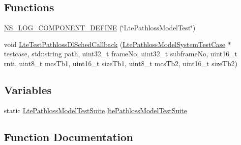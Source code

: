 \subsection*{Functions}
\begin{DoxyCompactItemize}
\item 
\hyperlink{lte-test-pathloss-model_8cc_a7faf96b7d347a42a910362c7371368f1}{N\+S\+\_\+\+L\+O\+G\+\_\+\+C\+O\+M\+P\+O\+N\+E\+N\+T\+\_\+\+D\+E\+F\+I\+NE} (\char`\"{}Lte\+Pathloss\+Model\+Test\char`\"{})
\item 
void \hyperlink{lte-test-pathloss-model_8cc_a84edf7cdf8785575c6b0553a9fa20543}{Lte\+Test\+Pathloss\+Dl\+Sched\+Callback} (\hyperlink{classLtePathlossModelSystemTestCase}{Lte\+Pathloss\+Model\+System\+Test\+Case} $\ast$testcase, std\+::string path, uint32\+\_\+t frame\+No, uint32\+\_\+t subframe\+No, uint16\+\_\+t rnti, uint8\+\_\+t mcs\+Tb1, uint16\+\_\+t size\+Tb1, uint8\+\_\+t mcs\+Tb2, uint16\+\_\+t size\+Tb2)
\end{DoxyCompactItemize}
\subsection*{Variables}
\begin{DoxyCompactItemize}
\item 
static \hyperlink{classLtePathlossModelTestSuite}{Lte\+Pathloss\+Model\+Test\+Suite} \hyperlink{lte-test-pathloss-model_8cc_a8fd304b5141294c8b791245c353c0cfa}{lte\+Pathloss\+Model\+Test\+Suite}
\end{DoxyCompactItemize}


\subsection{Function Documentation}
